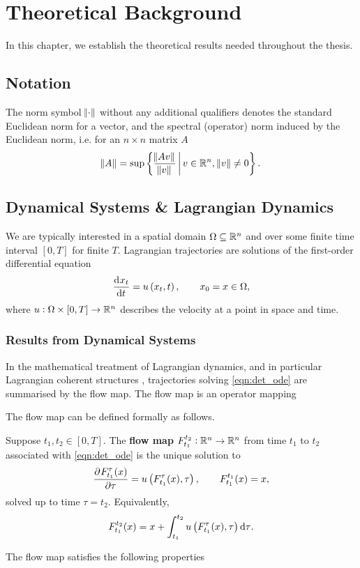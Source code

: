 
\chapter{Theoretical Background}
In this chapter, we establish the theoretical results needed throughout the thesis.


\section{Notation}


The norm symbol \(\norm{\cdot}\) without any additional qualifiers denotes the standard Euclidean norm for a vector, and the spectral (operator) norm induced by the Euclidean norm, i.e. for an \(n \times n\) matrix \(A\)
\[
	\norm{A} = \sup\left\{\frac{\norm{Av}}{\norm{v}}\,\middle|\,v \in \mathbb{R}^n, \, \norm{v} \neq 0\right\}.
\]



\section{Dynamical Systems \& Lagrangian Dynamics}


We are typically interested in a spatial domain \(\Omega \subseteq \mathbb{R}^n\) and over some finite time interval \([0,T]\) for finite \(T\).
Lagrangian trajectories are solutions of the first-order differential equation
\begin{equation}
	\dod{x_t}{t} = u\left(x_t, t\right), \qquad x_0 = x \in \Omega,
	\label{eqn:det_ode}
\end{equation}
where \(u: \Omega\times[0,T] \to \mathbb{R}^n\) describes the velocity at a point in space and time.



\subsection{Results from Dynamical Systems}
In the mathematical treatment of Lagrangian dynamics, and in particular Lagrangian coherent structures \citep{BalasuriyaEtAl_2018_GeneralizedLagrangianCoherent}, trajectories solving \eqref{eqn:det_ode} are summarised by the flow map.
The flow map is an operator mapping 

The flow map can be defined formally as follows.
\begin{defn}
	Suppose \(t_1, t_2 \in [0,T]\).
	The \textbf{flow map} \(F_{t_1}^{t_2}: \mathbb{R}^n \to \mathbb{R}^n\) from time \(t_1\) to \(t_2\) associated with \eqref{eqn:det_ode} is the unique solution to
	\[
		\dpd{F_{t_1}^{\tau}(x)}{\tau} = u\left(F_{t_1}^\tau(x), \tau\right), \qquad F_{t_1}^{t_1}(x) = x,
	\]
	solved up to time \(\tau = t_2\).
	Equivalently,
	\[
		F_{t_1}^{t_2}(x) = x + \int_{t_1}^{t_2}{u\left(F_{t_1}^\tau(x), \tau\right)\dif\tau}.
	\]
\end{defn}
The flow map satisfies the following properties


